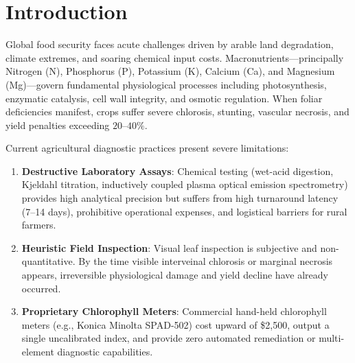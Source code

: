 \documentclass[9pt,twocolumn,a4paper,landscape]{article}
\begin{document}
\section{Introduction}
\label{sec:intro}
Global food security faces acute challenges driven by arable land degradation, climate extremes, and soaring chemical input costs. Macronutrients---principally Nitrogen (N), Phosphorus (P), Potassium (K), Calcium (Ca), and Magnesium (Mg)---govern fundamental physiological processes including photosynthesis, enzymatic catalysis, cell wall integrity, and osmotic regulation. When foliar deficiencies manifest, crops suffer severe chlorosis, stunting, vascular necrosis, and yield penalties exceeding $20\text{--}40\%$.

Current agricultural diagnostic practices present severe limitations:
\begin{enumerate}[leftmargin=*]
    \item \textbf{Destructive Laboratory Assays}: Chemical testing (wet-acid digestion, Kjeldahl titration, inductively coupled plasma optical emission spectrometry) provides high analytical precision but suffers from high turnaround latency (7--14 days), prohibitive operational expenses, and logistical barriers for rural farmers.
    \item \textbf{Heuristic Field Inspection}: Visual leaf inspection is subjective and non-quantitative. By the time visible interveinal chlorosis or marginal necrosis appears, irreversible physiological damage and yield decline have already occurred.
    \item \textbf{Proprietary Chlorophyll Meters}: Commercial hand-held chlorophyll meters (e.g., Konica Minolta SPAD-502) cost upward of \$2,500, output a single uncalibrated index, and provide zero automated remediation or multi-element diagnostic capabilities.
\end{enumerate}
\end{document}
